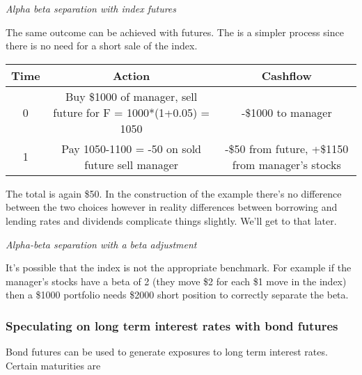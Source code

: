 \documentclass{tran-l}
\theoremstyle{definition}
\theoremstyle{remark}
\numberwithin{equation}{subsection}
\begin{document}
\textit{Alpha beta separation with index futures}

The same outcome can be achieved with futures. The is a simpler process since there is no need for a short sale of the index.


\begin{tabular}{|ccc|}
\hline
Time & Action & Cashflow\\
\hline
0 & Buy \$1000 of manager, sell future for F = 1000*(1+0.05) = 1050 &  -\$1000 to manager\\
1 & Pay 1050-1100 = -50 on sold future sell manager & -\$50 from future, +\$1150 from manager's stocks\\
\hline
\end{tabular}


The total is again \$50. In the construction of the example there's no difference between the two choices however in reality differences between borrowing and lending rates and dividends complicate things slightly. We'll get to that later.

\textit{Alpha-beta separation with a beta adjustment}

It's possible that the index is not the appropriate benchmark. For example if the manager's stocks have a beta of 2 (they move \$2 for each \$1 move in the index) then a \$1000 portfolio needs \$2000 short position to correctly separate the beta. 


\subsubsection{Speculating on long term interest rates with bond futures}

Bond futures can be used to generate exposures to long term interest rates. Certain maturities are  


 
 
 
 
 
\end{document}
